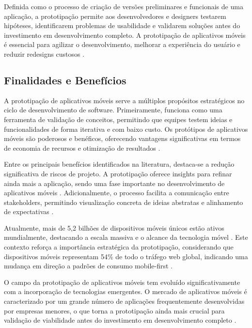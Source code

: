 Definida como o processo de criação de versões preliminares e funcionais de uma aplicação, a prototipação permite aos desenvolvedores e designers testarem hipóteses, identificarem problemas de usabilidade e validarem soluções antes do investimento em desenvolvimento completo. A prototipação de aplicativos móveis é essencial para agilizar o desenvolvimento, melhorar a experiência do usuário e reduzir redesigns custosos \cite{decode_benefits}.

\subsection{Finalidades e Benefícios}

A prototipação de aplicativos móveis serve a múltiplos propósitos estratégicos no ciclo de desenvolvimento de software. Primeiramente, funciona como uma ferramenta de validação de conceitos, permitindo que equipes testem ideias e funcionalidades de forma iterativa e com baixo custo. Os protótipos de aplicativos móveis são poderosos e benéficos, oferecendo vantagens significativas em termos de economia de recursos e otimização de resultados \cite{gojilabs_essential}.

Entre os principais benefícios identificados na literatura, destaca-se a redução significativa de riscos de projeto. A prototipação oferece insights para refinar ainda mais a aplicação, sendo uma fase importante no desenvolvimento de aplicativos móveis \cite{softsuave_guide}. Adicionalmente, o processo facilita a comunicação entre stakeholders, permitindo visualização concreta de ideias abstratas e alinhamento de expectativas \cite{okoone_benefits}.

Atualmente, mais de 5,2 bilhões de dispositivos móveis únicos estão ativos mundialmente, destacando a escala massiva e o alcance da tecnologia móvel \cite{netguru_prototyping}. Este contexto reforça a importância estratégica da prototipação, considerando que dispositivos móveis representam 54\% de todo o tráfego web global, indicando uma mudança em direção a padrões de consumo mobile-first \cite{netguru_prototyping}.

O campo da prototipação de aplicativos móveis tem evoluído significativamente com a incorporação de tecnologias emergentes. O mercado de aplicativos móveis é caracterizado por um grande número de aplicações frequentemente desenvolvidas por empresas menores, o que torna a prototipação ainda mais crucial para validação de viabilidade antes do investimento em desenvolvimento completo \cite{researchgate_ai_prototyping}.

